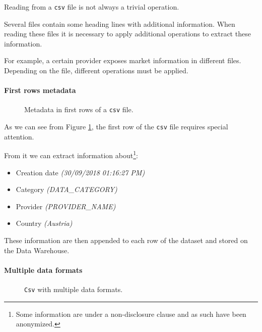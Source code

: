 Reading from a \texttt{csv} file is not always a trivial operation.

Several files contain some heading lines with additional information.
When reading these files it is necessary to apply additional operations to extract these information.

For example, a certain provider exposes market information in different files.
Depending on the file, different operations must be applied.

\paragraph{First rows metadata}
    \begin{figure}
        \centering
        \caption{Metadata in first rows of a \texttt{csv} file.}
        \label{fig:etl:csv:ac}
    \end{figure}
    
    As we can see from Figure \ref{fig:etl:csv:ac}, the first row of the \texttt{csv} file requires special attention.
    
    From it we can extract information about\footnote{
        Some information are under a non-disclosure clause and as such have been anonymized.
    }:
        \begin{itemize}
            \item Creation date \textit{(30/09/2018 01:16:27 PM)}
            \item Category \textit{(DATA\_CATEGORY)}
            \item Provider \textit{(PROVIDER\_NAME)}
            \item Country \textit{(Austria)}
        \end{itemize}
    These information are then appended to each row of the dataset and stored on the Data Warehouse.

\paragraph{Multiple data formats}
    \begin{figure}
        \centering
        \caption{\texttt{Csv} with multiple data formats.}
        \label{fig:etl:csv:bb}
    \end{figure}
    
